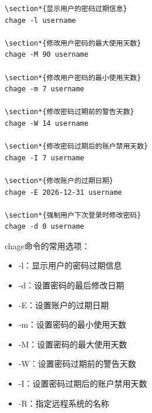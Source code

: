 \documentclass[12pt,UTF8]{ctexbook}
\begin{document}
\begin{verbatim}
\section*{显示用户的密码过期信息}
chage -l username

\section*{修改用户密码的最大使用天数}
chage -M 90 username

\section*{修改用户密码的最小使用天数}
chage -m 7 username

\section*{修改密码过期前的警告天数}
chage -W 14 username

\section*{修改密码过期后的账户禁用天数}
chage -I 7 username

\section*{修改账户的过期日期}
chage -E 2026-12-31 username

\section*{强制用户下次登录时修改密码}
chage -d 0 username
\end{verbatim}

chage命令的常用选项：
\begin{itemize}
    \item -l：显示用户的密码过期信息
    \item -d：设置密码的最后修改日期
    \item -E：设置账户的过期日期
    \item -m：设置密码的最小使用天数
    \item -M：设置密码的最大使用天数
    \item -W：设置密码过期前的警告天数
    \item -I：设置密码过期后的账户禁用天数
    \item -R：指定远程系统的名称
\end{itemize}
\end{document}
